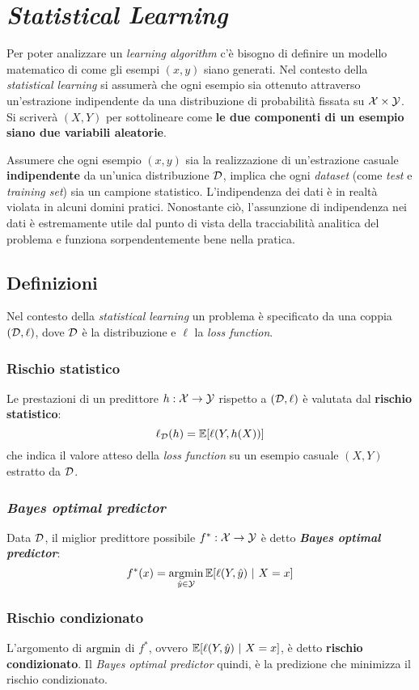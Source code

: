 \section{\textit{Statistical Learning}}

Per poter analizzare un \textit{learning algorithm} c'è bisogno di definire un modello
matematico di come gli esempi $(x,y)$ siano generati. Nel contesto della \textit{statistical
learning} si assumerà che ogni esempio sia ottenuto attraverso un'estrazione indipendente
da una distribuzione di probabilità fissata su $\mathcal{X} \times \mathcal{Y}$. Si scriverà $(X,Y)$ per
sottolineare come \textbf{le due componenti di un esempio siano due variabili aleatorie}.

Assumere che ogni esempio $(x,y)$ sia la realizzazione di un'estrazione casuale 
\textbf{indipendente} da un'unica distribuzione $\mathcal{D}$, implica che ogni \textit{dataset} 
(come \textit{test} e \textit{training set}) sia un campione statistico. L'indipendenza dei
dati è in realtà violata in alcuni domini pratici. Nonostante ciò, l'assunzione di indipendenza
nei dati è estremamente utile dal punto di vista della tracciabilità analitica del problema
e funziona sorpendentemente bene nella pratica.

\subsection{Definizioni}
Nel contesto della \textit{statistical learning} un problema è specificato da una coppia
$(\mathcal{D},\ell)$, dove $\mathcal{D}$ è la distribuzione e $\ell$ la \textit{loss function}.

\subsubsection{Rischio statistico}
Le prestazioni di un predittore $h:\mathcal{X} \rightarrow \mathcal{Y}$ rispetto a $(\mathcal{D},\ell)$ è valutata dal
\textbf{rischio statistico}:
$$ \ell_{\mathcal{D}}(h) = \mathbb{E}[\ell(Y,h(X))] $$
che indica il valore atteso della \textit{loss function} su un esempio casuale $(X,Y)$
estratto da $\mathcal{D}$.

\subsubsection{\textit{Bayes optimal predictor}}
Data $\mathcal{D}$, il miglior predittore possibile $f^*:\mathcal{X} \rightarrow \mathcal{Y}$ è detto 
\textbf{\textit{Bayes optimal predictor}}:
$$ f^*(x) = \operatorname*{argmin}_{\hat{y} \in \mathcal{Y}} \mathbb{E}[\ell(Y,\hat{y})\ | \ X=x] $$

\subsubsection{Rischio condizionato}
L'argomento di $\operatorname*{argmin}$ di $f^*$, ovvero $\mathbb{E}[\ell(Y,\hat{y})\ | \ X=x]$, è detto
\textbf{rischio condizionato}. Il \textit{Bayes optimal predictor} quindi, è la predizione
che minimizza il rischio condizionato.

